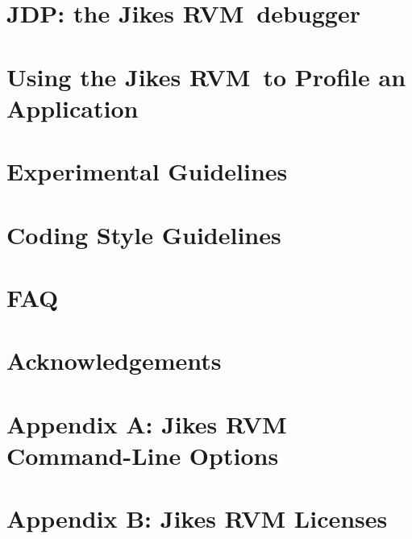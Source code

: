 \documentclass{article}
\newcommand{\jrvm}{Jikes RVM}
\begin{document}
\T \newpage
\section{JDP: the \jrvm\ debugger}


\T \newpage
\section{Using the \jrvm\ to Profile an Application}


\T \newpage
\section{Experimental Guidelines}


\T \newpage
\section{Coding Style Guidelines}


\T \newpage
\section{FAQ}


\T \newpage
\section*{Acknowledgements}


\T \newpage
\T 
\T 

\T \newpage

\T \appendix

\section{Appendix A: Jikes RVM Command-Line Options}
\label{appendix:nonadaptive:cmdline}


\section{Appendix B: Jikes RVM Licenses}
\label{appendix:licenses}


\W \section*{\indexname}\label{hlxindex}
\W \htmlprintindex
\T \printindex
\end{document}
